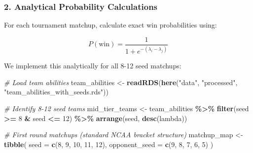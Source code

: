 \documentclass[
]{article}
\newenvironment{Shaded}{\begin{snugshade}}{\end{snugshade}}
\newcommand{\AttributeTok}[1]{\textcolor[rgb]{0.13,0.29,0.53}{#1}}
\newcommand{\CommentTok}[1]{\textcolor[rgb]{0.56,0.35,0.01}{\textit{#1}}}
\newcommand{\DecValTok}[1]{\textcolor[rgb]{0.00,0.00,0.81}{#1}}
\newcommand{\FunctionTok}[1]{\textcolor[rgb]{0.13,0.29,0.53}{\textbf{#1}}}
\newcommand{\NormalTok}[1]{#1}
\newcommand{\OtherTok}[1]{\textcolor[rgb]{0.56,0.35,0.01}{#1}}
\newcommand{\SpecialCharTok}[1]{\textcolor[rgb]{0.81,0.36,0.00}{\textbf{#1}}}
\newcommand{\StringTok}[1]{\textcolor[rgb]{0.31,0.60,0.02}{#1}}
\begin{document}
\subsubsection{2. Analytical Probability
Calculations}\label{analytical-probability-calculations}

For each tournament matchup, calculate exact win probabilities using:

\[
P(\text{win}) = \frac{1}{1 + e^{-(\lambda_i - \lambda_j)}}
\]

We implement this analytically for all 8-12 seed matchups:

\begin{Shaded}
\begin{Highlighting}[]
\CommentTok{\# Load team abilities}
\NormalTok{team\_abilities }\OtherTok{\textless{}{-}} \FunctionTok{readRDS}\NormalTok{(}\FunctionTok{here}\NormalTok{(}\StringTok{"data"}\NormalTok{, }\StringTok{"processed"}\NormalTok{, }\StringTok{"team\_abilities\_with\_seeds.rds"}\NormalTok{))}

\CommentTok{\# Identify 8{-}12 seed teams}
\NormalTok{mid\_tier\_teams }\OtherTok{\textless{}{-}}\NormalTok{ team\_abilities }\SpecialCharTok{\%\textgreater{}\%}
    \FunctionTok{filter}\NormalTok{(seed }\SpecialCharTok{\textgreater{}=} \DecValTok{8} \SpecialCharTok{\&}\NormalTok{ seed }\SpecialCharTok{\textless{}=} \DecValTok{12}\NormalTok{) }\SpecialCharTok{\%\textgreater{}\%}
    \FunctionTok{arrange}\NormalTok{(seed, }\FunctionTok{desc}\NormalTok{(lambda))}

\CommentTok{\# First round matchups (standard NCAA bracket structure)}
\NormalTok{matchup\_map }\OtherTok{\textless{}{-}} \FunctionTok{tibble}\NormalTok{(}
    \AttributeTok{seed =} \FunctionTok{c}\NormalTok{(}\DecValTok{8}\NormalTok{, }\DecValTok{9}\NormalTok{, }\DecValTok{10}\NormalTok{, }\DecValTok{11}\NormalTok{, }\DecValTok{12}\NormalTok{),}
    \AttributeTok{opponent\_seed =} \FunctionTok{c}\NormalTok{(}\DecValTok{9}\NormalTok{, }\DecValTok{8}\NormalTok{, }\DecValTok{7}\NormalTok{, }\DecValTok{6}\NormalTok{, }\DecValTok{5}\NormalTok{)}
\NormalTok{)}


\end{Highlighting}
\end{Shaded}
\end{document}
